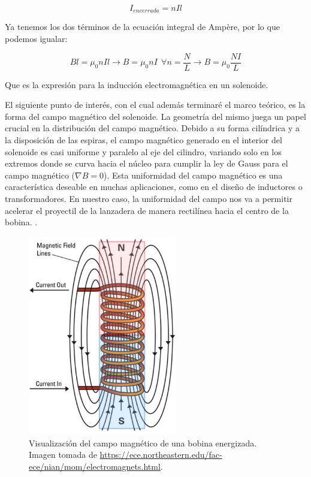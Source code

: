 \begin{center}
    \[I_{encerrada} = nIl\]
\end{center}

Ya tenemos los dos términos de la ecuación integral de Ampère, por lo que podemos igualar:

\begin{center}
    \[Bl=\mu_0nIl\to B=\mu_0nI~~\forall n=\frac{N}{L}\to B=\mu_0\frac{NI}{L}\]
\end{center}

Que es la expresión para la inducción electromagnética en un solenoide.

El siguiente punto de interés, con el cual además terminaré el marco teórico, es la forma del campo magnético del solenoide. La geometría del mismo juega un papel crucial en la distribución del campo magnético. Debido a su forma cilíndrica y a la disposición de las espiras, el campo magnético generado en el interior del solenoide es casi uniforme y paralelo al eje del cilindro, variando solo en los extremos donde se curva hacia el núcleo para cumplir la ley de Gauss para el campo magnético (\(\nabla B=0\)). Esta uniformidad del campo magnético es una característica deseable en muchas aplicaciones, como en el diseño de inductores o transformadores. En nuestro caso, la uniformidad del campo nos va a permitir acelerar el proyectil de la lanzadera de manera rectilínea hacia el centro de la bobina.\citep{purcell2013electricidad} \citep{griffiths2005}\citep{tipler2008}.

\begin{figure}[H]
    \centering %
    \includegraphics[width=6.5cm]{FigurasMemoria/electromagnet.png}
    \caption{Visualización del campo magnético de una bobina energizada. Imagen tomada de \href{URL}{https://ece.northeastern.edu/fac-ece/nian/mom/electromagnets.html}.}
    \label{fig:electromagnet} %
\end{figure}

